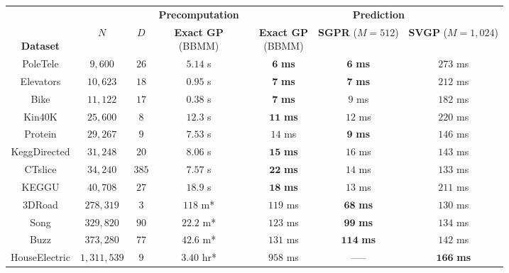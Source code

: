 \begin{tabular}{ cccccccc }
  \toprule
  &&& \multicolumn{1}{r}{\small\bf Precomputation} &&
  \multicolumn{3}{c}{{\bf Prediction}} \\
  \cline{4-4} \cline{6-8}
  \thead{\\{\bf Dataset}} & $N$ & $D$ &
  \thead{{\bf Exact GP} \\ (BBMM)} &&
  \thead{{\bf Exact GP} \\ (BBMM)} &
  \thead{{\bf SGPR} \\ ($M\!=\!512$)} &
  \thead{{\bf SVGP} \\ ($M\!=\!1,\!024$)}
  \\
  \midrule
	PoleTele             & $9,\!600$          & $26$  &  $5.14$ s    && $\mathbf{6}$ \textbf{ms}    & $\mathbf{6}$ \bf ms    & $273$ ms \\
	Elevators            & $10,\!623$         & $18$  &  $0.95$ s    && $\mathbf{7}$ \textbf{ms}    & $\mathbf{7}$ \bf ms    & $212$ ms \\
	Bike                 & $11,\!122$         & $17$  &  $0.38$ s    && $\mathbf{7}$ \textbf{ms}    & ${9}$ ms               & $182$ ms \\
	Kin40K               & $25,\!600$         & $8$   &  $12.3$ s     && $\mathbf{11}$ \textbf{ms}   & $       {12}$ ms       & $220$ ms \\
	Protein              & $29,\!267$         & $9$   &  $7.53$ s     && $       {14}$ ms            & $\mathbf{9}$ \bf ms    & $146$ ms \\
	KeggDirected         & $31,\!248$         & $20$  &  $8.06$ s    && $\mathbf{15}$ \textbf{ms}   & $       {16}$ ms       & $143$ ms \\
	CTslice              & $34,\!240$         & $385$ &  $7.57$ s   && $\mathbf{22}$ \textbf{ms}   & $       {14}$ ms       & $133$ ms \\
	KEGGU                & $40,\!708$         & $27$  &  $18.9$ s    && $\mathbf{18}$ \textbf{ms}   & $       {13}$ ms       & $211$ ms \\
	3DRoad               & $278,\!319$        & $3$   &  $118$ m*     && ${119}$ ms                  & $\mathbf{68}$ \bf ms   & $130$ ms \\
	Song                 & $329,\!820$        & $90$  &  $22.2$ m*   && ${123}$ ms                  & $\mathbf{99}$ \bf ms   & $134$ ms \\
	Buzz                 & $373,\!280$        & $77$  &  $42.6$ m*   && ${131}$ ms                  & $\mathbf{114}$ \bf ms  & $142$ ms \\
	HouseElectric        & $1,\!311,\!539$    & $9$   &  $3.40$ hr*   && ${958}$ ms                  & -----                  & $\mathbf{166}$ \textbf{ms} \\
  \bottomrule
\end{tabular}
